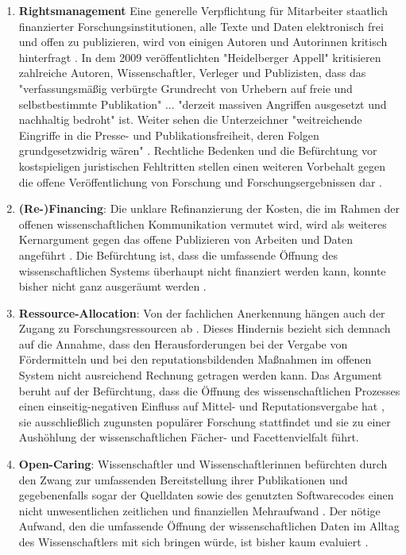 \begin{enumerate}
\item \textbf{Rightsmanagement} Eine generelle Verpflichtung für Mitarbeiter staatlich finanzierter Forschungsinstitutionen, alle Texte und Daten elektronisch frei und offen zu publizieren, wird von einigen Autoren und Autorinnen kritisch hinterfragt \cite{Peukert_2013}. In dem 2009 veröffentlichten "Heidelberger Appell" \cite{Heidelberger_Appell_2009} kritisieren zahlreiche Autoren, Wissenschaftler, Verleger und Publizisten, dass das "verfassungsmäßig verbürgte Grundrecht von Urhebern auf freie und selbstbestimmte Publikation" ... "derzeit massiven Angriffen ausgesetzt und nachhaltig bedroht" ist. Weiter sehen die Unterzeichner "weitreichende Eingriffe in die Presse- und Publikationsfreiheit, deren Folgen grundgesetzwidrig wären" \cite{ITK_2009}. Rechtliche Bedenken und die Befürchtung vor kostspieligen juristischen Fehltritten stellen einen weiteren Vorbehalt gegen die offene Veröffentlichung von Forschung und Forschungsergebnissen dar \cite{Weishaupt_2009}.
\item \textbf{(Re-)Financing}: Die unklare Refinanzierung der Kosten, die im Rahmen der offenen wissenschaftlichen Kommunikation vermutet wird, wird als weiteres Kernargument gegen das offene Publizieren von Arbeiten und Daten angeführt \cite{Chibnik_2015}. Die Befürchtung ist, dass die umfassende Öffnung des wissenschaftlichen Systems überhaupt nicht finanziert werden kann, konnte bisher nicht ganz ausgeräumt werden \cite{Weishaupt_2009}.
\item \textbf{Ressource-Allocation}: Von der fachlichen Anerkennung hängen auch der Zugang zu Forschungsressourcen ab \cite[:14]{Buss_2001}. Dieses Hindernis bezieht sich demnach auf die Annahme, dass den Herausforderungen bei der Vergabe von Fördermitteln und bei den reputationsbildenden Maßnahmen im offenen System nicht ausreichend Rechnung getragen werden kann. Das Argument beruht auf der Befürchtung, dass die Öffnung des wissenschaftlichen Prozesses einen einseitig-negativen Einfluss auf Mittel- und Reputationsvergabe hat \cite{Grand_2012}, sie ausschließlich zugunsten populärer Forschung stattfindet und sie zu einer Aushöhlung der wissenschaftlichen Fächer- und Facettenvielfalt führt.
\item \textbf{Open-Caring}: Wissenschaftler und Wissenschaftlerinnen befürchten durch den Zwang zur umfassenden Bereitstellung ihrer Publikationen und gegebenenfalls sogar der Quelldaten sowie des genutzten Softwarecodes einen nicht unwesentlichen zeitlichen und finanziellen Mehraufwand \cite[:27]{BBAW_2015} \cite{Mennes_2013} \cite{Grand_2012}. Der nötige Aufwand, den die umfassende Öffnung der wissenschaftlichen Daten im Alltag des Wissenschaftlers mit sich bringen würde, ist bisher kaum evaluiert \cite{Osterloh_2008}.

\end{enumerate}
